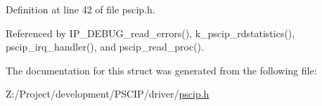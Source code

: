 Definition at line 42 of file pscip.h.

Referenced by IP\_\-DEBUG\_\-read\_\-errors(), k\_\-pscip\_\-rdstatistics(), pscip\_\-irq\_\-handler(), and pscip\_\-read\_\-proc().

The documentation for this struct was generated from the following file:\begin{CompactItemize}
\item 
Z:/Project/development/PSCIP/driver/\hyperlink{pscip_8h}{pscip.h}\end{CompactItemize}
